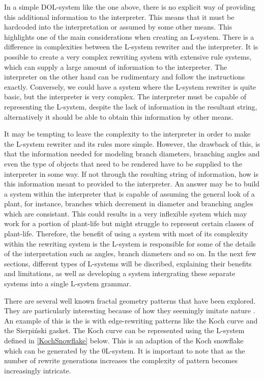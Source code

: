 In a simple DOL-system like the one above, there is no explicit way of providing this additional information to the interpreter. This means that it must be hardcoded into the interpretation or assumed by some other means. This highlights one of the main considerations when creating an L-system. There is a difference in complexities between the L-system rewriter and the interpreter. It is possible to create a very complex rewriting system with extensive rule systems, which can supply a large amount of information to the interpreter. The interpreter on the other hand can be rudimentary and follow the instructions exactly. Conversely, we could have a system where the L-system rewriter is quite basic, but the interpreter is very complex. The interpreter must be capable of representing the L-system, despite the lack of information in the resultant string, alternatively it should be able to obtain this information by other means. 

It may be tempting to leave the complexity to the interpreter in order to make the L-system rewriter and its rules more simple. However, the drawback of this, is that the information needed for modeling branch diameters, branching angles and even the type of objects that need to be rendered have to be supplied to the interpreter in some way. If not through the resulting string of information, how is this information meant to provided to the interpreter. An answer may be to build a system within the interpreter that is capable of assuming the general look of a plant, for instance, branches which decrement in diameter and branching angles which are consistant. This could results in a very inflexible system which may work for a portion of plant-life but might struggle to represent certain classes of plant-life. Therefore, the benefit of using a system with most of its complexity within the rewriting system is the L-system is responsible for some of the details of the interpretation such as angles, branch diameters and so on. In the next few sections, different types of L-systems will be discribed, explaining their benefits and limitations, as well as developing a system intergrating these separate systems into a single L-system grammar.   

There are several well known fractal geometry patterns that have been explored. They are particularly interesting because of how they seemingly imitate nature \cite{mandelbrot1982fractal}. An example of this is the is with edge-rewriting patterns like the Koch curve and the Sierpi\'{n}ski gasket. The Koch curve can be represented using the L-system defined in \ref{KochSnowflake} below. This is an adaption of the Koch snowflake which can be generated by the 0L-system. It is important to note that as the number of rewrite generations increases the complexity of pattern becomes increasingly intricate.

